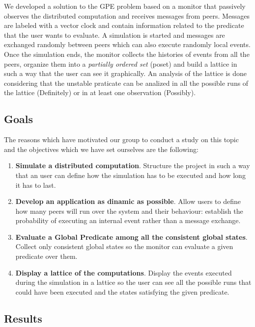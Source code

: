 \documentclass[10pt]{article}
\begin{document}
We developed a solution to the GPE problem based on a monitor that passively observes the distributed computation and receives messages from peers. Messages are labeled with a vector clock and contain information related to the predicate that the user wants to evaluate. A simulation is started and messages are exchanged randomly between peers which can also execute randomly local events. Once the simulation ends, the monitor collects the histories of events from all the peers, organize them into a \textit{partially ordered set} (poset) and build a lattice in such a way that the user can see it graphically. An analysis of the lattice is done considering that the unstable praticate can be analized in all the possible runs of the lattice (Definitely) or in at least one observation (Possibly).


\newpage

\subsection{Goals}

The reasons which have motivated our group to conduct a study on this topic and the objectives which we have set ourselves are the following:
\begin{enumerate}
\item \textbf{Simulate a distributed computation}. Structure the project in such a way that an user can define how the simulation has to be executed and how long it has to last.
\item \textbf{Develop an application as dinamic as possible}. Allow users to define how many peers will run over the system and their behaviour: establish the probability of executing an internal event rather than a message exchange.
\item \textbf{Evaluate a Global Predicate among all the consistent global states}. Collect only consistent global states so the monitor can evaluate a given predicate over them.
\item \textbf{Display a lattice of the computations}. Display the events executed during the simulation in a lattice so the user can see all the possible runs that could have been executed and the states satisfying the given predicate.
\end{enumerate}

\subsection{Results}
\end{document}
